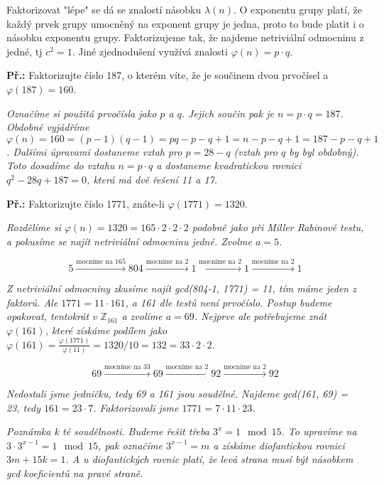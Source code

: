 \documentclass[10pt,a4paper]{article}
\begin{document}
Faktorizovat "lépe" se dá se znalostí násobku $\lambda(n)$. O exponentu grupy platí, že každý prvek grupy umocněný na exponent grupy je jedna, proto to bude platit i o násobku exponentu grupy. Faktorizujeme tak, že najdeme netriviální odmocninu z jedné, tj $c^2 = 1$. Jiné zjednodušení využívá znalosti $\varphi(n) = p \cdot q$.

\textbf{Př.:} Faktorizujte číslo 187, o kterém víte, že je součinem dvou prvočísel a $\varphi(187) = 160$.

\textit{Označíme si použitá prvočísla jako $p$ a $q$. Jejich součin pak je $n = p \cdot q = 187$. Obdobně vyjádříme $\varphi(n) = 160 = (p-1)(q-1) = pq - p - q + 1 = n - p - q + 1 = 187 - p - q + 1$. Dalšími úpravami dostaneme vztah pro $p = 28 - q$ (vztah pro $q$ by byl obdobný). Toto dosadíme do vztahu $n = p\cdot q$ a dostaneme kvadratickou rovnici $q^2 - 28q + 187 = 0$, která má dvě řešení 11 a 17.}

\textbf{Př.:} Faktorizujte číslo 1771, znáte-li $\varphi(1771) = 1320$.

\textit{Rozdělíme si $\varphi(n) = 1320 = 165 \cdot 2 \cdot 2 \cdot 2$ podobně jako při Miller Rabinově testu, a pokusíme se najít netriviální odmocninu jedné. Zvolme $a = 5$.}

$$ 5 \xrightarrow{\text{mocníme na 165}} 804 \xrightarrow{\text{mocníme na 2}} 1 \xrightarrow{\text{mocníme na 2}} 1 \xrightarrow{\text{mocníme na 2}} 1$$

\textit{Z netriviální odmocniny zkusíme najít gcd(804-1, 1771) = 11, tím máme jeden z faktorů. Ale $1771 = 11 \cdot 161$, a 161 dle testů není prvočíslo. Postup budeme opakovat, tentokrát v $\mathbb{Z}_{161}$ a zvolíme $a = 69$. Nejprve ale potřebujeme znát $\varphi(161)$, které získáme podílem jako $\varphi(161) = \frac{\varphi(1771)}{\varphi(11)} = 1320/10 = 132 = 33 \cdot 2 \cdot 2$.}

$$69 \xrightarrow{\text{mocníme na 33}} 69 \xrightarrow{\text{mocníme na 2}} 92 \xrightarrow{\text{mocníme na 2}} 92$$

\textit{Nedostali jsme jedničku, tedy 69 a 161 jsou soudělné. Najdeme gcd(161, 69) = 23, tedy $161 = 23 \cdot 7$. Faktorizovali jsme $1771 = 7 \cdot 11 \cdot 23$.}

\textit{Poznámka k té soudělnosti. Budeme řešit třeba $3^x = 1 \mod 15$. To upravíme na $3\cdot 3^{x-1} = 1 \mod 15$, pak označíme $3^{x-1} = m$ a získáme diofantickou rovnici $3m + 15k = 1$. A u diofantických rovnic platí, že levá strana musí být násobkem gcd koeficientů na pravé straně.}
\end{document}
